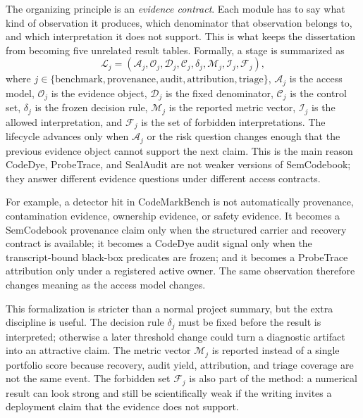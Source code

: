 The organizing principle is an \emph{evidence contract}. Each module has to say what kind of observation it produces, which denominator that observation belongs to, and which interpretation it does not support. This is what keeps the dissertation from becoming five unrelated result tables. Formally, a stage is summarized as
\begin{equation}
  \mathcal{L}_j =
  (\mathcal{A}_j,\mathcal{O}_j,\mathcal{D}_j,\mathcal{C}_j,\delta_j,\mathcal{M}_j,\mathcal{I}_j,\mathcal{F}_j),
  \label{eq:lifecycle-stage}
\end{equation}
where $j\in\{\mathrm{benchmark},\mathrm{provenance},\mathrm{audit},\mathrm{attribution},\mathrm{triage}\}$, $\mathcal{A}_j$ is the access model, $\mathcal{O}_j$ is the evidence object, $\mathcal{D}_j$ is the fixed denominator, $\mathcal{C}_j$ is the control set, $\delta_j$ is the frozen decision rule, $\mathcal{M}_j$ is the reported metric vector, $\mathcal{I}_j$ is the allowed interpretation, and $\mathcal{F}_j$ is the set of forbidden interpretations. The lifecycle advances only when $\mathcal{A}_j$ or the risk question changes enough that the previous evidence object cannot support the next claim. This is the main reason CodeDye, ProbeTrace, and SealAudit are not weaker versions of SemCodebook; they answer different evidence questions under different access contracts.

For example, a detector hit in CodeMarkBench is not automatically provenance, contamination evidence, ownership evidence, or safety evidence. It becomes a SemCodebook provenance claim only when the structured carrier and recovery contract is available; it becomes a CodeDye audit signal only when the transcript-bound black-box predicates are frozen; and it becomes a ProbeTrace attribution only under a registered active owner. The same observation therefore changes meaning as the access model changes.

This formalization is stricter than a normal project summary, but the extra discipline is useful. The decision rule $\delta_j$ must be fixed before the result is interpreted; otherwise a later threshold change could turn a diagnostic artifact into an attractive claim. The metric vector $\mathcal{M}_j$ is reported instead of a single portfolio score because recovery, audit yield, attribution, and triage coverage are not the same event. The forbidden set $\mathcal{F}_j$ is also part of the method: a numerical result can look strong and still be scientifically weak if the writing invites a deployment claim that the evidence does not support.

